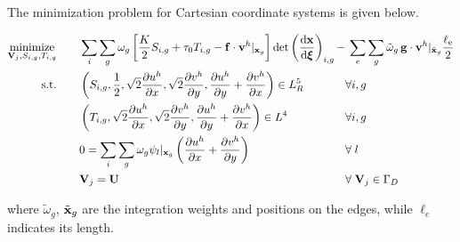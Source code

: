 \documentclass[11 pt]{report}
\begin{document}
\pagebreak
The minimization problem for Cartesian coordinate systems is given below.%
\begin{empheqboxed}
    \begin{equation}
        \begin{alignedat}{2}
            \operatorname*{minimize}_{\mathbf{V}_j, S_{i,g}, T_{i,g}} &\qquad \sum_{i}\sum_{g} \omega_g \left[\frac{K}{2} S_{i,g} + \tau_0 T_{i,g} - \mathbf{f} \cdot \mathbf{v}^h \vert_{\mathbf{x}_g} \right] \det \left(\dv{\mathbf{x}}{\boldsymbol \xi}\right)_{i,g}
            - && \: \sum_{e}\sum_{g} \tilde \omega_g \,\mathbf{g}\cdot \mathbf{v}^h\vert_{\tilde {\mathbf{x}}_g} \frac{\ell_{\text{e}}}{2}\\
            \textrm{s.t.} &\qquad \left(S_{i,g}, \frac{1}{2}, \sqrt{2}\pdv{u^h}{x}, \sqrt{2}\pdv{v^h}{y}, \pdv{u^h}{y}+\pdv{v^h}{x}\right) \in L_R^5 && \forall i, g\\
            &\qquad \left(T_{i,g}, \sqrt{2}\pdv{u^h}{x}, \sqrt{2}\pdv{v^h}{y}, \pdv{u^h}{y}+\pdv{v^h}{x}\right) \in L^4 && \forall i, g\\
            &\qquad 0 = \sum_i \sum_g \omega_g \psi_l \vert_{\mathbf{x}_g} \left(\pdv{u^h}{x} + \pdv{v^h}{y}\right) && \forall\; l\\
            &\qquad \mathbf{V}_{j} = \mathbf{U} && \forall\; \mathbf{V}_{j} \in \Gamma_D
        \end{alignedat}
        \label{eq:functional2D}
    \end{equation}
\end{empheqboxed}
where $\tilde \omega_g$, $\tilde {\mathbf{x}}_g$ are the integration weights and positions on the edges, while $\ell_e$ indicates its length.
\end{document}
